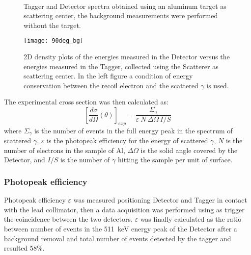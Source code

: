 \begin{figure}[h!]
	\centering
	 \quad
	 \quad
	 \quad
	\\
	\caption{Tagger and Detector spectra obtained using an aluminum target as scattering center, the background measurements were performed without the target.}
	\label{Fig:CrossSection_spectra}
\end{figure}
\newpage

\begin{figure}[H]
\centering
\texttt{[image: 90deg\_bg]}
\caption{2D density plots of the energies measured in the Detector versus the energies measured in the Tagger, collected using the Scatterer as scattering center. In the left figure a condition of energy conservation between the recoil electron and the scattered $\gamma$ is used.}
\label{Fig:2D_comparison}
\end{figure}



The experimental cross section was then calculated as:
\begin{equation*}
	\left[\frac{d\sigma}{d\Omega}(\theta)\right]_{exp}=\frac{\Sigma_\gamma}{\varepsilon\ N\ \Delta\Omega\ I/S}
\end{equation*}
 where $\Sigma_\gamma$ is the number of events in the full energy peak in the spectrum of scattered $\gamma$, $\varepsilon$ is the photopeak efficiency for the energy of scattered  $\gamma$, $N$ is the number of electrons in the sample of Al, $\Delta\Omega$ is the solid angle covered by the Detector, and $I/S$ is the number of $\gamma$ hitting the sample per unit of surface. 
 
 
\subsubsection*{Photopeak efficiency}
Photopeak efficiency $\varepsilon$ was measured positioning Detector and Tagger in contact with the lead collimator, then a data acquisition was performed using as trigger the coincidence between the two detectors.
 $\varepsilon$ was finally calculated as the ratio between number of events in the 511~keV energy peak of the Detector after a background removal and total number of events detected by the tagger and resulted 58\%.
